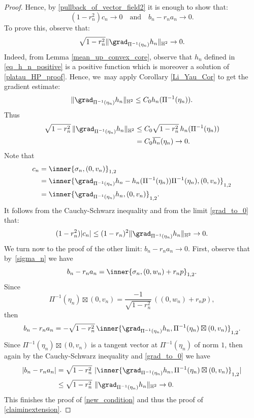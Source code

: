 \begin{proof}
Hence, by \eqref{pullback_of_vector_field2} it is enough to show that:
\begin{equation}\label{new_condition}
(1 - r_n^2) c_n \to 0 \quad \text{and} \quad b_n - r_n a_n \to 0.
\end{equation}
To prove this, observe that:
\begin{equation}\label{grad_to_0}
\sqrt{1 - r_n^2} \lVert \grad_{\Pi^{-1}(\eta_n)} h_n \rVert_{\mathbb{H}^2} \to 0.
\end{equation}
Indeed, from Lemma \ref{mean_up_convex_core}, observe that \(h_n\) defined in \eqref{eq_h_n_positive} is a positive function which is moreover a solution of \eqref{platau_HP_proof}. Hence, we~may apply Corollary \ref{Li_Yau_Cor} to get the gradient estimate:
\[
\lVert \grad_{\Pi^{-1}(\eta_n)} h_n\rVert_{\mathbb{H}^2}\leq C_0 h_n(\Pi^{-1}(\eta_n)).
\]
Thus \begin{align*}
\sqrt{1-r_n^2}\,\lVert\grad_{\Pi^{-1}(\eta_n)} h_n\rVert_{\mathbb{H}^2}&\leq C_0\sqrt{1-r_n^2}\,h_n(\Pi^{-1}(\eta_n))\\
&=C_0\overline{h_n}(\eta_n)\to 0.
\end{align*}
Note that \begin{align*}
c_n&=\inner{\sigma_n,(0,v_n)}_{1,2}\\
&=\inner{\grad_{\Pi^{-1}(\eta_n)}h_n-h_n(\Pi^{-1}(\eta_n))\Pi^{-1}(\eta_n),(0,v_n)}_{1,2}\\
&= \inner{\grad_{\Pi^{-1}(\eta_n)}h_n,(0,v_n)}_{1,2}.
\end{align*} It follows from the Cauchy-Schwarz inequality and from the limit \eqref{grad_to_0} that:
\[
(1-r_n^2)\lvert c_n\rvert\leq (1-r_n)^2\lVert\grad_{\Pi^{-1}(\eta_n)}h_n\rVert_{\mathbb{H}^2} \to 0.
\]
We turn now to the proof of the other limit: $b_n-r_na_n\to 0$. First, observe that by~\eqref{sigma_n} we have
\[
b_n-r_na_n=\inner{\sigma_n,(0,w_n)+r_np}_{1,2}.
\]
Since
\[
\Pi^{-1}(\eta_n)\boxtimes(0,v_n)=\frac{-1}{\sqrt{1-r_n^2}}\,((0,w_n)+r_np),
\]
then
\[
b_n-r_na_n=-\sqrt{1-r_n^{2}}\,\inner{\grad_{\Pi^{-1}(\eta_n)}h_n,\Pi^{-1}(\eta_n)\boxtimes (0,v_n)}_{1,2}.
\]
Since $\Pi^{-1}(\eta_n)\boxtimes (0,v_n)$ is a tangent vector at $\Pi^{-1}(\eta_n)$ of norm $1$, then again by the Cauchy-Schwarz inequality and \eqref{grad_to_0} we have
\begin{align*}
\lvert b_n-r_na_n\rvert&=\sqrt{1-r_n^{2}}\ \lvert\inner{\grad_{\Pi^{-1}(\eta_n)}h_n,\Pi^{-1}(\eta_n)\boxtimes (0,v_n)}_{1,2}\vert\\
&\leq \sqrt{1-r_n^{2}}\ \lVert \grad_{\Pi^{-1}(\eta_n)}h_n\rVert_{\mathbb{H}^2}\to 0.
\end{align*}
This finishes the proof of \eqref{new_condition} and thus the proof of \eqref{claiminextension}.


\end{proof}
